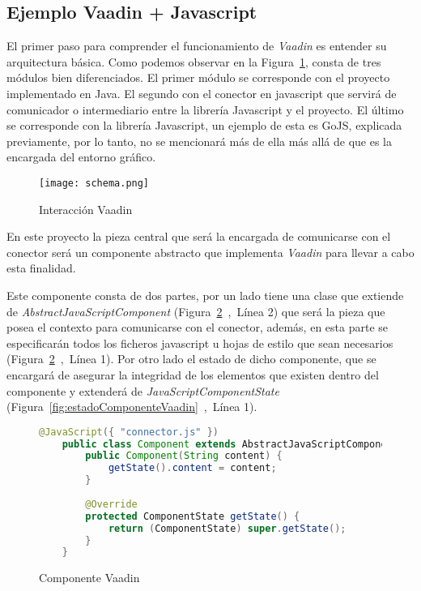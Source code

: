 \subsection{Ejemplo Vaadin + Javascript}

El primer paso para comprender el funcionamiento de \emph{Vaadin} es entender su arquitectura básica. Como podemos observar en la Figura~\ref{fig:schema}, consta de tres módulos bien diferenciados. El primer módulo se corresponde con el proyecto implementado en Java. El segundo con el conector en javascript que servirá de comunicador o intermediario entre la librería Javascript y el proyecto. El último se corresponde con la librería Javascript, un ejemplo de esta es GoJS, explicada previamente, por lo tanto, no se mencionará más de ella más allá de que es la encargada del entorno gráfico.



\begin{figure}[!tb]
	\centering
	\texttt{[image: schema.png]}
	\caption{Interacción Vaadin}\label{fig:schema}
\end{figure}




En este proyecto la pieza central que será la encargada de comunicarse con el conector será un componente abstracto que implementa \emph{Vaadin} para llevar a cabo esta finalidad.

Este componente consta de dos partes, por un lado tiene una clase que extiende de \emph{AbstractJavaScriptComponent} (Figura~\ref{fig:componenteVaadin}~,~Línea 2) que será la pieza que posea el contexto para comunicarse con el conector, además, en esta parte se especificarán todos los ficheros javascript u hojas de estilo que sean necesarios (Figura~\ref{fig:componenteVaadin}~,~Línea 1). Por otro lado el estado de dicho componente, que se encargará de asegurar la integridad de los elementos que existen dentro del componente y extenderá de \emph{JavaScriptComponentState} (Figura~\ref{fig:estadoComponenteVaadin}~,~Línea 1).

\begin{figure}[!tb]
	\centering
	\begin{lstlisting}[language=Java]
	@JavaScript({ "connector.js" })
	public class Component extends AbstractJavaScriptComponent {
		public Component(String content) {
			getState().content = content;
		}
		
		@Override
		protected ComponentState getState() {
			return (ComponentState) super.getState();
		}
	}\end{lstlisting}
	\caption{Componente Vaadin}
	\label{fig:componenteVaadin}
\end{figure}


